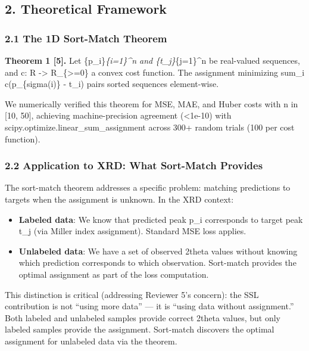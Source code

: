 \documentclass[
  11pt,
]{article}
\providecommand{\tightlist}{%
  \setlength{\itemsep}{0pt}\setlength{\parskip}{0pt}}
\begin{document}
\subsection{2. Theoretical Framework}\label{theoretical-framework}

\subsubsection{2.1 The 1D Sort-Match
Theorem}\label{the-1d-sort-match-theorem}

\textbf{Theorem 1 {[}5{]}.} Let \{p\_i\}\emph{\{i=1\}\^{}n and
\{t\_j\}}\{j=1\}\^{}n be real-valued sequences, and c: R -\textgreater{}
R\_\{\textgreater=0\} a convex cost function. The assignment minimizing
sum\_i c(p\_\{sigma(i)\} - t\_i) pairs sorted sequences element-wise.

We numerically verified this theorem for MSE, MAE, and Huber costs with
n in {[}10, 50{]}, achieving machine-precision agreement
(\textless1e-10) with scipy.optimize.linear\_sum\_assignment across 300+
random trials (100 per cost function).

\subsubsection{2.2 Application to XRD: What Sort-Match
Provides}\label{application-to-xrd-what-sort-match-provides}

The sort-match theorem addresses a specific problem: matching
predictions to targets when the assignment is unknown. In the XRD
context:

\begin{itemize}
\tightlist
\item
  \textbf{Labeled data}: We know that predicted peak p\_i corresponds to
  target peak t\_j (via Miller index assignment). Standard MSE loss
  applies.
\item
  \textbf{Unlabeled data}: We have a set of observed 2theta values
  without knowing which prediction corresponds to which observation.
  Sort-match provides the optimal assignment as part of the loss
  computation.
\end{itemize}

This distinction is critical (addressing Reviewer 5's concern): the SSL
contribution is not ``using more data'' --- it is ``using data without
assignment.'' Both labeled and unlabeled samples provide correct 2theta
values, but only labeled samples provide the assignment. Sort-match
discovers the optimal assignment for unlabeled data via the theorem.
\end{document}
